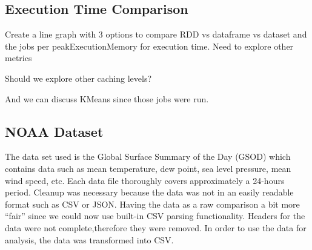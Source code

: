 \documentclass[conference]{IEEEtran}
\begin{document}
\subsection{Execution Time Comparison}
Create a line graph with 3 options to compare RDD vs dataframe vs dataset and the jobs per peakExecutionMemory for execution time. Need to explore other metrics

Should we explore other caching levels?

And we can discuss KMeans since those jobs were run.







\subsection{NOAA Dataset}\label{NOAA}
The data set used is the Global Surface Summary of the Day (GSOD) which contains data such as mean temperature, dew point, sea level pressure, mean wind speed, etc.
Each data file thoroughly covers approximately a 24-hours period.
Cleanup was necessary because the data was not in an easily readable format such as CSV or JSON. Having the data as a raw comparison a bit more “fair” since we could now use built-in CSV parsing functionality.
Headers for the data were not complete,therefore they were removed. In order to use the data for analysis, the data was transformed into CSV.
\end{document}

